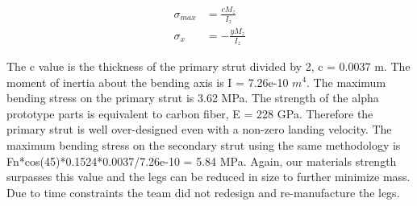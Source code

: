 
\begin{equation}
    \label{eq:buckling}
    \begin{split}
        \sigma_{max} &= \frac{c M_z}{I_z} \\[5pt]
        \sigma_x &= -\frac{y M_z}{I_z}
    \end{split}
\end{equation}

The c value is the thickness of the primary strut divided by 2, c = 0.0037 m. The moment of inertia about the bending axis is I = 7.26e-10 $m^4$. The maximum bending stress on the primary strut is 3.62 MPa. The strength of the alpha prototype parts is equivalent to carbon fiber, E = 228 GPa. Therefore the primary strut is well over-designed even with a non-zero landing velocity. The maximum bending stress on the secondary strut using the same methodology is Fn*cos(45)*0.1524*0.0037/7.26e-10 = 5.84 MPa. Again, our materials strength surpasses this value and the legs can be reduced in size to further minimize mass. Due to time constraints the team did not redesign and re-manufacture the legs.   